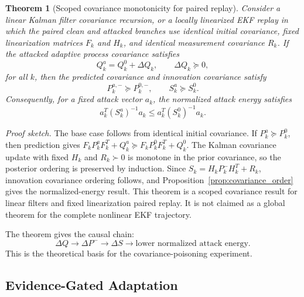 \documentclass[conference]{IEEEtran}
\newtheorem{theorem}{Theorem}
\begin{document}
\begin{theorem}[Scoped covariance monotonicity for paired replay]
\label{thm:dynamic_poisoning}
Consider a linear Kalman filter covariance recursion, or a locally linearized
EKF replay in which the paired clean and attacked branches use identical
initial covariance, fixed linearization matrices $F_k$ and $H_k$, and identical
measurement covariance $R_k$. If the attacked adaptive process covariance
satisfies
\begin{equation}
    Q_k^a = Q_k^0 + \Delta Q_k, \qquad \Delta Q_k \succeq 0,
\end{equation}
for all $k$, then the predicted covariance and innovation covariance satisfy
\begin{equation}
    P_k^{a,-}\succeq P_k^{0,-},
    \qquad
    S_k^a\succeq S_k^0.
\end{equation}
Consequently, for a fixed attack vector $a_k$, the normalized attack energy
satisfies
\begin{equation}
    a_k^T(S_k^a)^{-1}a_k
    \leq
    a_k^T(S_k^0)^{-1}a_k.
\end{equation}
\end{theorem}

\emph{Proof sketch.} The base case follows from identical initial covariance.
If $P_k^a\succeq P_k^0$, then prediction gives
$F_kP_k^aF_k^T+Q_k^a\succeq F_kP_k^0F_k^T+Q_k^0$. The Kalman covariance update
with fixed $H_k$ and $R_k\succ0$ is monotone in the prior covariance, so the
posterior ordering is preserved by induction. Since
$S_k=H_kP_k^-H_k^T+R_k$, innovation covariance ordering follows, and
Proposition~\ref{prop:covariance_order} gives the normalized-energy result.
This theorem is a scoped covariance result for linear filters and fixed
linearization paired replay. It is not claimed as a global theorem for the
complete nonlinear EKF trajectory.

The theorem gives the causal chain:
\[
    \Delta Q \rightarrow \Delta P^- \rightarrow \Delta S
    \rightarrow \text{lower normalized attack energy}.
\]
This is the theoretical basis for the covariance-poisoning experiment.

\subsection{Evidence-Gated Adaptation}
\end{document}
